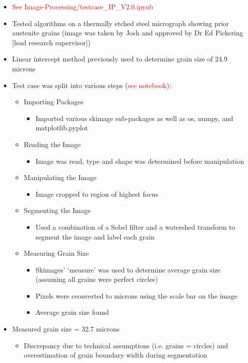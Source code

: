 \documentclass{article}
\begin{document}
\begin{itemize}
\item \textcolor{red}{See Image-Processing/testcase\_IP\_V2.0.ipynb}
\item Tested algorithms on a thermally etched steel micrograph showing prior austenite grains (image was taken by Josh and approved by Dr Ed Pickering [lead research supervisor])
\item Linear intercept method previously used to determine grain size of 24.9 microns
\item Test case was split into various steps (\textcolor{red}{see notebook}):
\begin{itemize}
\item Importing Packages
\begin{itemize}
\item Imported various skimage sub-packages as well as os, numpy, and matplotlib.pyplot
\end{itemize}
\item Reading the Image
\begin{itemize}
\item Image was read, type and shape was determined before manipulation
\end{itemize}
\item Manipulating the Image
\begin{itemize}
\item Image cropped to region of highest focus
\end{itemize}
\item Segmenting the Image
\begin{itemize}
\item Used a combination of a Sobel filter and a watershed transform to segment the image and label each grain
\end{itemize}
\item Measuring Grain Size
\begin{itemize}
\item Skimages’ ‘measure’ was used to determine average grain size (assuming all grains were perfect circles)
\item Pixels were ceonverted to microns using the scale bar on the image
\item Average grain size found
\end{itemize}
\end{itemize}
\item Measured grain size = 32.7 microns
\begin{itemize}
\item Discrepancy due to technical assumptions (i.e. grains = circles) and overestimation of grain boundary width during segmentation
\end{itemize}
\end{itemize}
\end{document}
